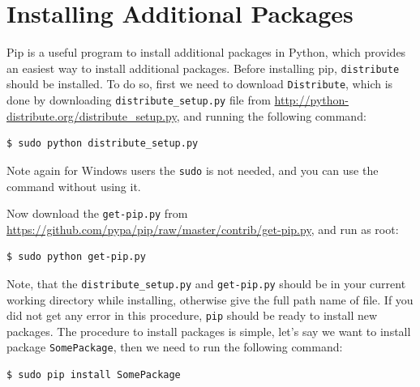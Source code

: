 \documentclass[10pt]{book}
\begin{document}

\section{Installing Additional Packages}
\label{install}
Pip is a useful program to install additional packages in Python, which provides an 
easiest way to install additional packages. 
Before installing pip, \verb"distribute" should be installed. 
To do so, first we need to download \verb"Distribute", 
which is done by downloading \verb"distribute_setup.py" file from 
\url{http://python-distribute.org/distribute\_setup.py}, 
and running the following command:
\beforeverb
\begin{verbatim}
$ sudo python distribute_setup.py
\end{verbatim}
\afterverb
Note again for Windows users the \verb"sudo" is not needed, and you can use the command
without using it. \\


Now download the \verb"get-pip.py" from 
\url{https://github.com/pypa/pip/raw/master/contrib/get-pip.py}, and run as root:
\beforeverb
\begin{verbatim}
$ sudo python get-pip.py
\end{verbatim}
\afterverb

Note, that the \verb"distribute_setup.py" and \verb"get-pip.py" should be in 
your current working directory while installing, otherwise give the full path 
name of file. If you did not get any error in this procedure, \verb"pip" should 
be ready to install new packages. The procedure to install packages is simple, let's say
we want to install package \verb"SomePackage", then we need to run the following command:
\beforeverb
\begin{verbatim}
$ sudo pip install SomePackage
\end{verbatim}
\afterverb
\end{document}
